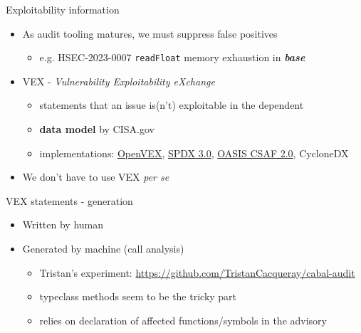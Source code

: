 \documentclass[ignorenonframetext,aspectratio=169,12pt]{beamer}
\begin{document}
\begin{frame}{Exploitability information}
  \begin{itemize}
    \item As audit tooling matures, we must suppress false positives
      \begin{itemize}
        \item e.g. HSEC-2023-0007 {\tt readFloat} memory exhaustion
          in {\em \textbf{base}}
      \end{itemize}
      
    \item VEX - {\em Vulnerability Exploitability eXchange}
      \begin{itemize}
        \item statements that an issue is(n't) exploitable in the
          dependent
        \item {\bf data model} by CISA.gov
        \item implementations:
          \href{https://github.com/openvex/spec}{OpenVEX},
          \href{https://spdx.dev/capturing-software-vulnerability-data-in-spdx-3-0/}{SPDX 3.0},
          \href{https://www.oasis-open.org/2022/11/21/new-version-of-csaf-standard/}{OASIS CSAF 2.0},
          CycloneDX 
      \end{itemize}
    \item We don't have to use VEX {\em per se}
  \end{itemize}
\end{frame}

\begin{frame}{VEX statements - generation}
  \begin{itemize}
    \item Written by human
    \item Generated by machine (call analysis)
      \begin{itemize}
        \item Tristan's experiment: \url{https://github.com/TristanCacqueray/cabal-audit}
        \item typeclass methods seem to be the tricky part
        \item relies on declaration of affected
          functions/symbols in the advisory
      \end{itemize}
  \end{itemize}
\end{frame}
\end{document}
